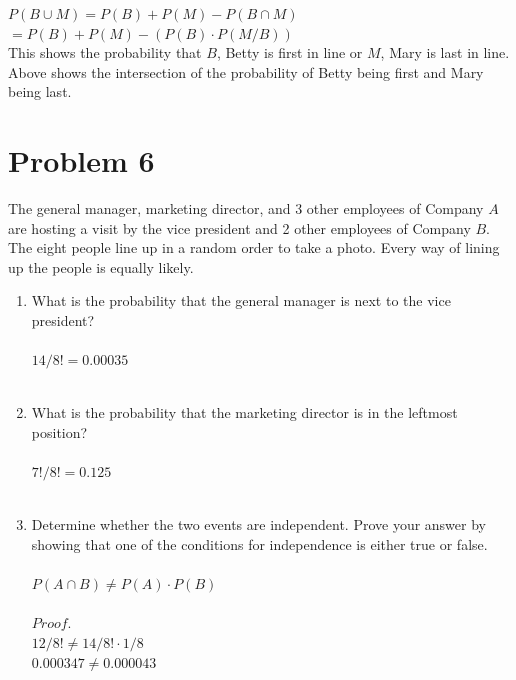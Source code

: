 \documentclass{amsart}
\theoremstyle{definition}
\theoremstyle{Exercise}
\theoremstyle{remark}
\theoremstyle{rule}
\numberwithin{equation}{section}
\begin{document}
$P(B\cup M) = P(B) + P(M) - P(B\cap M)$\\
$= P(B) + P(M) - (P(B)\cdot P(M/B))$\\

This shows the probability that $B$, Betty is first in line or $M$, Mary is last in line.  Above shows the intersection of the probability of Betty being first and Mary being last.\\

  \newpage
  \section*{Problem 6}
The general manager, marketing director, and 3 other employees of Company $A$ are hosting a visit by the vice president and 2 other employees of Company $B$. The eight people line up in a random order to take a photo. Every way of lining up the people is equally likely.
\begin{enumerate}[label=(\alph*)]
  \item What is the probability that the general manager is next to the vice president?
\\\\
  $14/8! = 0.00035$
\\\\
  \item What is the probability that the marketing director is in the leftmost position?
\\\\
  $7!/8! = 0.125$
\\\\
  \item Determine whether the two events are independent. Prove your answer by showing that one of the conditions for independence is either true or false.
 \\\\
  $P(A\cap B) \neq P(A) \cdot P(B)$\\\\
  $Proof.$\\
  $12/8! \neq 14/8! \cdot 1/8$\\
  $0.000347 \neq 0.000043$
  
\\\\
\end{enumerate}
\end{document}
